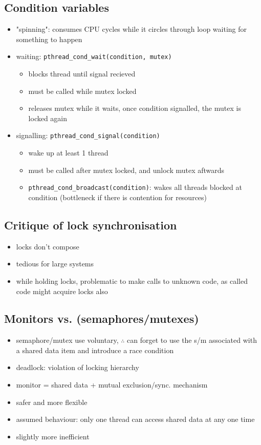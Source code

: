 \documentclass[10pt, multicolumn, a4paper]{article}
\begin{document}
\begin{multicols}{2}
	\subsection*{Condition variables}
	\begin{itemize}
	\item "spinning": consumes CPU cycles while it circles through loop waiting for something to happen
	\item waiting: \verb|pthread_cond_wait(condition, mutex)|
		\begin{itemize}
		\item blocks thread until signal recieved
		\item must be called while mutex locked
		\item releases mutex while it waits, once condition signalled, the mutex is locked again
		\end{itemize}
	\item signalling: \verb|pthread_cond_signal(condition)|
		\begin{itemize}
		\item wake up at least 1 thread
		\item must be called after mutex locked, and unlock mutex aftwards
		\item \verb|pthread_cond_broadcast(condition)|: wakes all threads blocked at condition (bottleneck if there is contention for resources)
		\end{itemize}
	\end{itemize}
	\subsection*{Critique of lock synchronisation}
	\begin{itemize}
	\item locks don't compose
	\item tedious for large systems
	\item while holding locks, problematic to make calls to unknown code, as called code might acquire locks also
	\end{itemize}
	\subsection*{Monitors vs. (semaphores/mutexes)}
	\begin{itemize}
	\item semaphore/mutex use voluntary, $\therefore$ can forget to use the s/m associated with a shared data item and introduce a race condition
	\item deadlock: violation of locking hierarchy
	\item monitor = shared data + mutual exclusion/sync. mechanism
	\item safer and more flexible
	\item assumed behaviour: only one thread can access shared data at any one time
	\item slightly more inefficient
	\end{itemize}

\end{multicols}
\end{document}
